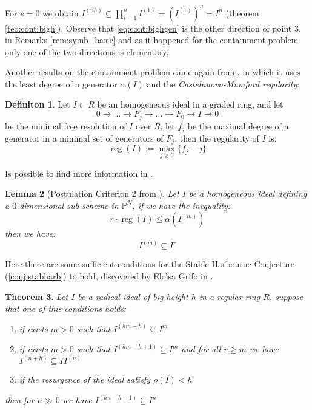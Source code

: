 \documentclass[notitlepage, a4]{book}
\theoremstyle{plain}
\newtheorem{teo}{Theorem}[section]
\newtheorem{lem}[teo]{Lemma}
\theoremstyle{remark}
\theoremstyle{definition}
\newtheorem{deff}[teo]{Definiton}
\newcommand{\PP}{\mathbb{P}}
\newcommand{\cont}[2]{ I^{(#1)} \subseteq I^{#2}}
\DeclareMathOperator{\reg}{reg}
\begin{document}
For $ s=0 $ we obtain $ I^{(nh)} \subseteq \prod_{i=1}^{n} I^{(1)} = ( I^{(1)} )^n = I^n$ (theorem \ref{teo:cont:bigh}). Observe that \ref{eq:cont:bighgen} is the other direction of point $ 3. $ in Remarks \ref{rem:symb_basic} and as it happened for the containment problem only one of the two directions is elementary. 

Another results on the containment problem came again from \cite{BocciHrabourne10}, in which it uses the least degree of a generator $\alpha(I)$ and the \textit{Castelnuovo-Mumford regularity}:

\begin{deff} \label{def:reg}
Let $ I \subset R $ be an homogeneous ideal in a graded ring, and let 
\[
0 \to \dots \to F_j \to \dots \to F_0 \to I \to 0
\]
be the minimal free resolution of $ I $ over $ R $, let $ f_j $ be the maximal degree of a generator in a minimal set of generators of  $ F_j $, then the regularity of $ I $ is:
\[ 
 \reg(I) := \max_{j\geq 0} \{f_j - j \}
\]
\end{deff}

Is possible to find more information in \cite[Section 20.5]{Eisenbud95}. 

\begin{lem}[Postulation Criterion 2 from \cite{BocciHrabourne10}] \label{lem:cont:reg}
Let $ I $ be a homogeneous ideal defining a $ 0 $-dimensional sub-scheme in $ \PP^N $, if we have the inequality:
\begin{equation}\label{eq:cont:reg}
r \cdot \reg(I) \leq \alpha(I^{(m)})
\end{equation}
then we have:
\[ \cont{m}{r}\]
\end{lem}


Here there are some sufficient conditions for the Stable Harbourne Conjecture (\ref{conj:stabharb}) to hold, discovered by Eloìsa Grifo in \cite{Grifo20}. 


\begin{teo} \label{teo:cont:grifo0}
Let $ I $ be a radical ideal of big height $ h $ in a regular ring $ R $, suppose that one of this conditions holds:
\begin{enumerate}
\item if exists $ m>0 $ such that $ \cont{hm - h}{m} $
\item if exists $ m>0 $ such that $ \cont{hm - h +1 }{m} $ and for all $ r \geq m $ we have $ \cont{n+h }{ }I^{(n)}$
\item if the resurgence of the ideal satisfy $ \rho(I) < h $
\end{enumerate}
then for $ n \gg 0  $ we have $ \cont{hn - h +1}{n} $
\end{teo}
\end{document}
